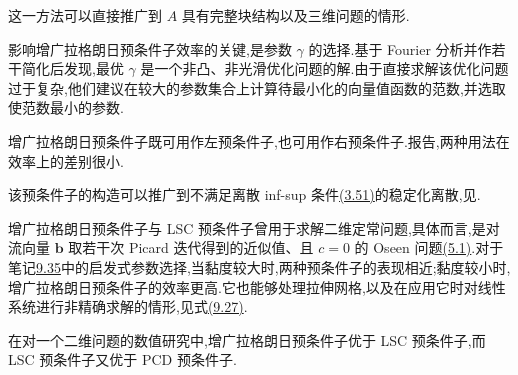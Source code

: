 \begin{note}[基于增广拉格朗日方法的预条件子]
这一方法可以直接推广到 $A$ 具有完整块结构以及三维问题的情形.

影响增广拉格朗日预条件子效率的关键,是参数 $\gamma$ 的选择.\textcite{BenziWang2011}基于 Fourier 分析并作若干简化后发现,最优 $\gamma$ 是一个非凸、非光滑优化问题的解.由于直接求解该优化问题过于复杂,他们建议在较大的参数集合上计算待最小化的向量值函数的范数,并选取使范数最小的参数.

\end{note}


\begin{note}[增广拉格朗日预条件子的数值表现]
\label{note:chapter9-augmented-lagrangian-experience}
增广拉格朗日预条件子既可用作左预条件子,也可用作右预条件子.\textcite{BenziWang2011}报告,两种用法在效率上的差别很小.

该预条件子的构造可以推广到不满足离散 inf-sup 条件\hyperref[eq:discrete-infsup-condition]{(3.51)}的稳定化离散,见\textcite{BenziWang2011}.

增广拉格朗日预条件子与 LSC 预条件子曾用于求解二维定常问题,具体而言,是对流向量 $\bm b$ 取若干次 Picard 迭代得到的近似值、且 $c=0$ 的 Oseen 问题\hyperref[eq:oseen-strong]{(5.1)}.对于笔记\hyperref[note:chapter9-augmented-lagrangian]{9.35}中的启发式参数选择,当黏度较大时,两种预条件子的表现相近;黏度较小时,增广拉格朗日预条件子的效率更高.它也能够处理拉伸网格,以及在应用它时对线性系统进行非精确求解的情形,见式\hyperref[eq:chapter9-augmented-lagrangian-inverse]{(9.27)}.

在\textcite{UrRehman2008}对一个二维问题的数值研究中,增广拉格朗日预条件子优于 LSC 预条件子,而 LSC 预条件子又优于 PCD 预条件子.
\end{note}

